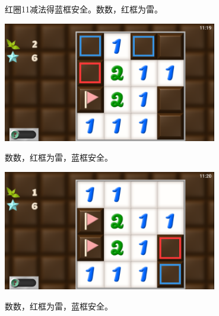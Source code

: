 红圈11减法得蓝框安全。数数，红框为雷。
\begin{center}
    \includegraphics[width=0.7\textwidth]{puzzle/21-5.png}
\end{center}
数数，红框为雷，蓝框安全。
\begin{center}
    \includegraphics[width=0.7\textwidth]{puzzle/21-6.png}
\end{center}
数数，红框为雷，蓝框安全。


